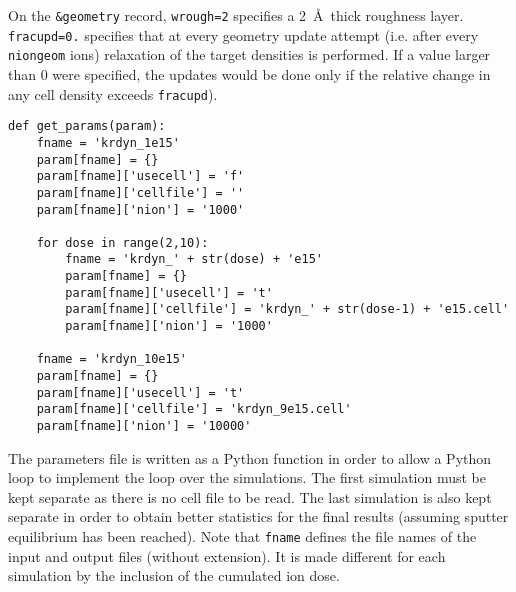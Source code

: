 On the \texttt{\&geometry} record, \texttt{wrough=2} specifies a 2~\AA\ thick
roughness layer. \texttt{fracupd=0.} specifies that at every geometry
update attempt (i.e. after every \texttt{niongeom} ions) relaxation
of the target densities is performed. If a value larger than 0 were specified,
the updates would be done only if the relative change in any cell density
exceeds \texttt{fracupd}).

\begin{verbatim}
def get_params(param):
    fname = 'krdyn_1e15'
    param[fname] = {}
    param[fname]['usecell'] = 'f'
    param[fname]['cellfile'] = ''
    param[fname]['nion'] = '1000'
    
    for dose in range(2,10):
        fname = 'krdyn_' + str(dose) + 'e15'
        param[fname] = {}
        param[fname]['usecell'] = 't'
        param[fname]['cellfile'] = 'krdyn_' + str(dose-1) + 'e15.cell'
        param[fname]['nion'] = '1000'
    
    fname = 'krdyn_10e15'
    param[fname] = {}
    param[fname]['usecell'] = 't'
    param[fname]['cellfile'] = 'krdyn_9e15.cell'
    param[fname]['nion'] = '10000'
\end{verbatim}

The parameters file is written as a Python function in order to allow a Python
loop to implement the loop over the simulations. The first simulation must be
kept separate as there is no cell file to be read. The last simulation is also
kept separate in order to obtain better statistics for the final results
(assuming sputter equilibrium has been reached). Note that \texttt{fname}
defines the file names of the input and output files (without extension). It is
made different for each simulation by the inclusion of the cumulated ion dose.
